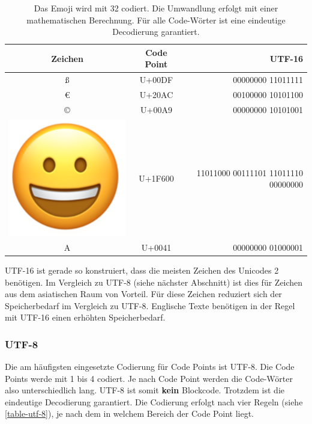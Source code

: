 \begin{table}[htb]
\centering
\begin{tabular}{|c|c|r|}
\hline
Zeichen & Code Point & UTF-16 \\ \hline
ß     	& U+00DF	& 00000000 11011111\\ \hline
€     	& U+20AC     	& 00100000 10101100\\ \hline
©     	& U+00A9     	& 00000000 10101001\\ \hline
\rule{0pt}{15pt} \includegraphics[scale=0.1]{emoji_grinning_face} & U+1F600	& 11011000 00111101 11011110 00000000\\ \hline
A & U+0041		& 00000000 01000001\\ \hline
\end{tabular}
\caption{Das Emoji wird mit \qty{32}{\bit} codiert. Die Umwandlung erfolgt mit einer mathematischen Berechnung. Für alle Code-Wörter ist eine eindeutige Decodierung garantiert.}
\label{table-utf-16}
\end{table}

UTF-16 ist gerade so konstruiert, dass die meisten Zeichen des Unicodes  \qty{2}{\byte} benötigen. Im Vergleich zu UTF-8 (siehe nächster Abschnitt) ist dies für Zeichen aus dem asiatischen Raum von Vorteil. Für diese Zeichen reduziert sich der Speicherbedarf im Vergleich zu UTF-8. Englische Texte benötigen in der Regel mit UTF-16 einen erhöhten Speicherbedarf.

\subsubsection{UTF-8}

Die am häufigsten eingesetzte Codierung für Code Points ist UTF-8. Die Code Points werde mit \qty{1}{\byte} bis \qty{4}{\byte} codiert. Je nach Code Point werden die Code-Wörter also unterschiedlich lang. UTF-8 ist somit \textbf{kein} Blockcode. Trotzdem ist die eindeutige Decodierung garantiert. Die Codierung erfolgt nach vier Regeln (siehe \autoref{table-utf-8}), je nach dem in welchem Bereich der Code Point liegt.

